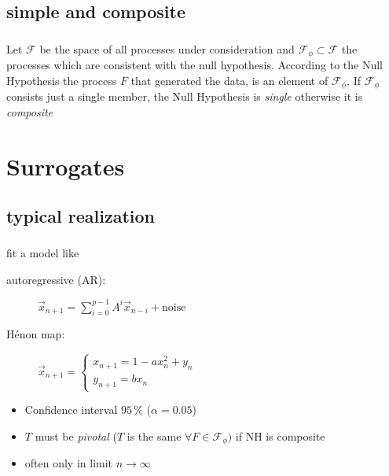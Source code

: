 \subsection{simple and composite}
\begin{frame}
\frametitle{\insertsectionhead}
\framesubtitle{\insertsubsectionhead}
Let $\mathcal{F}$ be the space of all processes under consideration and $\mathcal{F}_\phi\subset \mathcal{F}$ the processes which are consistent with the null hypothesis. According to the Null Hypothesis the process $F$ that generated the data, is an element of $\mathcal{F}_\phi$. If $\mathcal{F}_\phi$ consists just a single member, the Null Hypothesis is \textit{single} otherwise it is \textit{composite} \cite{THEILER1996221}
\end{frame}

\section{Surrogates}
\subsection{typical realization}
\begin{frame}
  \frametitle{\insertsectionhead}
  \framesubtitle{\insertsubsectionhead}
  fit a model like
  \begin{description}
    \item[autoregressive (AR):] $\vec{x}_{n+1} = \sum_{i=0}^{p-1} A^i \vec{x}_{n-i} + \mathrm{noise}$
    \item[Hénon map:] $ \vec{x}_{n+1} = \begin{cases} x_{n+1} = 1 - a x_n^2+y_n\\ y_{n+1} = b x_n \end{cases}$
  \end{description}
  \begin{itemize}

    \item Confidence interval $95\,\%$ ($\alpha=0.05$)
    \item $T$ must be \textit{pivotal} ($T$ is the same $\forall F \in \mathcal{F}_\phi)$ if NH is composite
    \item often only in limit $n\to\infty$
  \end{itemize}
\end{frame}

